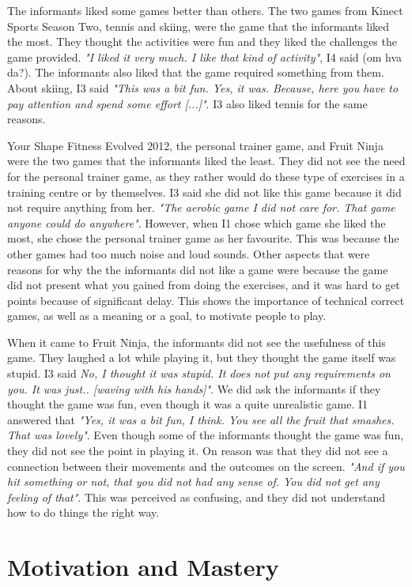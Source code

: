 The informants liked some games better than others. The two games from Kinect Sports Season Two, tennis and skiing, were the game that the informants liked the most. They thought the activities were fun and they liked the challenges the game provided. \emph{"I liked it very much. I like that kind of activity"}, I4 said (om hva da?). The informants also liked that the game required something from them. About skiing, I3 said \emph{"This was a bit fun. Yes, it was. Because, here you have to pay attention and spend some effort [...]"}. I3 also liked tennis for the same reasons.  

Your Shape Fitness Evolved 2012, the personal trainer game, and Fruit Ninja were the two games that the informants liked the least. They did not see the need for the personal trainer game, as they rather would do these type of exercises in a training centre or by themselves. I3 said she did not like this game because it did not require anything from her. \emph{"The aerobic game I did not care for. That game anyone could do anywhere"}. However, when I1 chose which game she liked the most, she chose the personal trainer game as her favourite. This was because the other games had too much noise and loud sounds. Other aspects that were reasons for why the the informants did not like a game were because the game did not present what you gained from doing the exercises, and it was hard to get points because of significant delay. This shows the importance of technical correct games, as well as a meaning or a goal, to motivate people to play. 

When it came to Fruit Ninja, the informants did not see the usefulness of this game. They laughed a lot while playing it, but they thought the game itself was stupid. I3 said \emph{No, I thought it was stupid. It does not put any requirements on you. It was just.. [waving with his hands]"}. We did ask the informants if they thought the game was fun, even though it was a quite unrealistic game. I1 answered that \emph{"Yes, it was a bit fun, I think. You see all the fruit that smashes. That was lovely"}. Even though some of the informants thought the game was fun, they did not see the point in playing it. On reason was that they did not see a connection between their movements and the outcomes on the screen. \emph{"And if you hit something or not, that you did not had any sense of. You did not get any feeling of that"}. This was perceived as confusing, and they did not understand how to do things the right way. 

\section{Motivation and Mastery}

